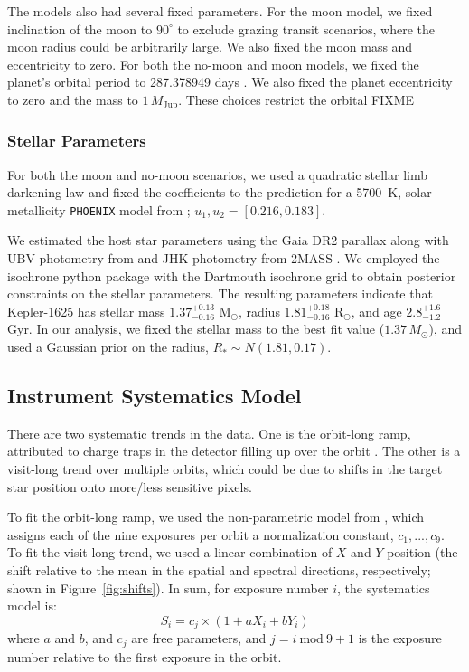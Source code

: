 \documentclass[twocolumn]{aastex62}
\newcommand{\Mod}[1]{\ \mathrm{mod}\ #1}
\begin{document}
The models also had several fixed parameters. For the moon model, we fixed inclination of the moon to $90^\circ$ to exclude grazing transit scenarios, where the moon radius could be arbitrarily large.  We also fixed the moon mass and eccentricity to zero.  For both the no-moon and moon models, we fixed the planet's orbital period to 287.378949 days \citep{teachey18b}. We also fixed the planet eccentricity to zero and the mass to $1\,M_\mathrm{Jup}$.  These choices restrict the orbital FIXME


\subsubsection{Stellar Parameters}
For both the moon and no-moon scenarios, we used a quadratic stellar limb darkening law and fixed the coefficients to the prediction for a 5700~K, solar metallicity \texttt{PHOENIX} model from \cite{espinoza15}; $u_1, u_2 = [0.216, 0.183]$.  

We estimated the host star parameters using the Gaia DR2 parallax \citep{Gaia, GaiaDR2} along with UBV photometry from \citet{Everett2012} and JHK photometry from 2MASS \citep{2MASS}. We employed the isochrone python package \citep{isochrone} with the Dartmouth isochrone grid \citep{Dotter2008} to obtain posterior constraints on the stellar parameters. The resulting parameters indicate that Kepler-1625 has stellar mass $1.37^{+0.13}_{-0.16}$ M$_{\odot}$, radius $1.81^{+0.18}_{-0.16}$ R$_{\odot}$, and age $2.8^{+1.6}_{-1.2}$ Gyr. In our analysis, we fixed the stellar mass to the best fit value ($1.37\,M_\odot$), and used a Gaussian prior on the radius, $R_* \sim N(1.81, 0.17)$.


\subsection{Instrument Systematics Model}
There are two systematic trends in the data. One is the orbit-long ramp, attributed to charge traps in the detector filling up over the orbit \citep{zhou17}. The other is a visit-long trend over multiple orbits, which could be due to shifts in the target star position onto more/less sensitive pixels.

To fit the orbit-long ramp, we used the non-parametric model from \cite{teachey18b}, which assigns each of the nine exposures per orbit a normalization constant, $c_1, ..., c_9$. To fit the visit-long trend, we used a linear combination of $X$ and $Y$ position (the shift relative to the mean in the spatial and spectral directions, respectively; shown in Figure~\ref{fig:shifts}).  In sum, for exposure number $i$, the systematics model is:
\begin{equation}
S_i = c_{j}\times(1 + aX_i + bY_i) 
\end{equation}
where $a$ and $b$, and $c_j$ are free parameters, and $j = i\Mod9 + 1$ is the exposure number relative to the first exposure in the orbit.
\end{document}

